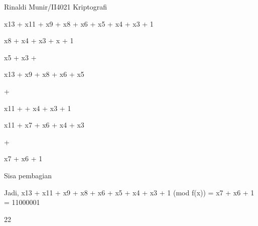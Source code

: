 \documentclass{article}
\begin{document}

Rinaldi Munir/II4021 Kriptografi

x13 + x11 + x9 + x8 + x6 + x5 + x4 + x3 +  1 

x8 +  x4 +  x3 + x + 1 

x5 + x3 + 


x13               + x9 + x8 + x6 + x5 

+

x11 +                            + x4 + x3 +  1 

x11 +                x7 + x6 + x4 + x3  

+

x7 + x6                 +   1 

Sisa pembagian

Jadi, x13 + x11 + x9 + x8 + x6 + x5 + x4 + x3 + 1 (mod f(x)) = x7 + x6 + 1  = 11000001

22
\end{document}
